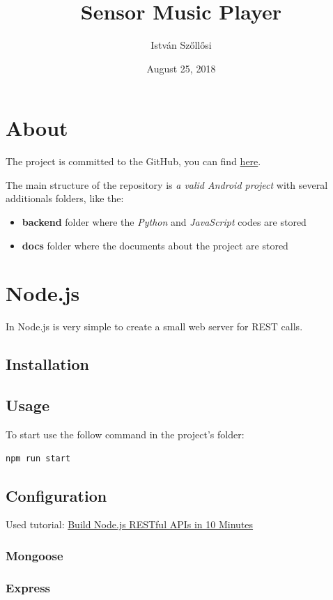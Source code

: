 \documentclass[12pt, a4paper, portrait]{article}
\title{\textbf{Sensor Music Player}}
\author{István Szőllősi}
\affil{Faculty of Sciences and Letters, ``Petru Maior'' University of Târgu Mureș}
\date{August 25, 2018}
\begin{document}
\maketitle
\newpage

\tableofcontents
\newpage

\section{About}
The project is committed to the GitHub, you can find \href{https://github.com/I-sty/SensorMusicPlayer/}{here}.
\par The main structure of the repository is
\textit{a valid Android project} with several additionals folders, like the:
\begin{itemize}
\item{\textbf{backend}} folder where the \textit{Python} and \textit{JavaScript} codes are stored
\item{\textbf{docs}} folder where the documents about the project are stored
\end{itemize}

\pagebreak
\section{Node.js}
In Node.js is very simple to create a small web server for REST calls.
\subsection{Installation}
\subsection{Usage}
To start use the follow command in the project's folder:
\begin{lstlisting}[language=bash]
npm run start
\end{lstlisting}
\subsection{Configuration}
Used tutorial: \href{https://www.codementor.io/olatundegaruba/nodejs-restful-apis-in-10-minutes-q0sgsfhbd}{Build Node.js RESTful APIs in 10 Minutes}
\subsubsection{Mongoose}
\subsubsection{Express}
\end{document}
